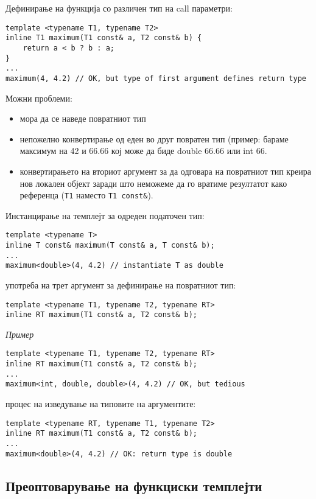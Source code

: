 Дефинирање на функција со различен тип на call параметри:
\begin{lstlisting}
template <typename T1, typename T2>
inline T1 maximum(T1 const& a, T2 const& b) {
	return a < b ? b : a;
}
...
maximum(4, 4.2) // OK, but type of first argument defines return type
\end{lstlisting}

Можни проблеми:
\begin{itemize}
  \item мора да се наведе повратниот тип
  \item непожелно конвертирање од еден во друг повратен тип (пример: бараме
  максимум на 42 и 66.66 кој може да биде double 66.66 или int 66.
  \item конвертирањето на вториот аргумент за да одговара на повратниот тип
  креира нов локален објект заради што неможеме да го вратиме резултатот како
  референца (\texttt{T1} наместо \texttt{T1 const\&}).
\end{itemize}

Инстанцирање на темплејт за одреден податочен тип:

\begin{lstlisting}
template <typename T>
inline T const& maximum(T const& a, T const& b);
...
maximum<double>(4, 4.2) // instantiate T as double
\end{lstlisting}

употреба на трет аргумент за дефинирање на повратниот тип:

\begin{lstlisting}
template <typename T1, typename T2, typename RT>
inline RT maximum(T1 const& a, T2 const& b);
\end{lstlisting}

\textsl{Пример}
\begin{lstlisting}
template <typename T1, typename T2, typename RT>
inline RT maximum(T1 const& a, T2 const& b);
...
maximum<int, double, double>(4, 4.2) // OK, but tedious
\end{lstlisting}

процес на изведување на типовите на аргументите:
\begin{lstlisting}
template <typename RT, typename T1, typename T2>
inline RT maximum(T1 const& a, T2 const& b);
...
maximum<double>(4, 4.2) // OK: return type is double
\end{lstlisting}

\subsection{Преоптоварување на функциски темплејти}

